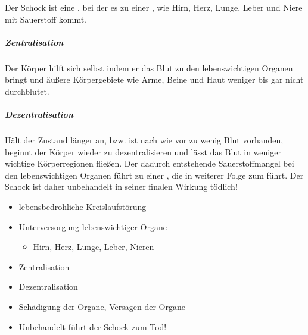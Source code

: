 {
Der Schock ist eine , bei der es zu einer
, wie Hirn,
Herz, Lunge, Leber und Niere mit Sauerstoff kommt. 

\subparagraph{Zentralisation} Der Körper hilft sich
selbst indem er das Blut zu den lebenswichtigen Organen bringt und äußere Körpergebiete wie Arme,
Beine und Haut weniger bis gar nicht durchblutet. 

\subparagraph{Dezentralisation} Hält
der Zustand länger an, bzw. ist nach wie vor zu wenig Blut vorhanden, beginnt
der Körper wieder zu dezentralisieren und lässt das Blut in weniger
wichtige Körperregionen fließen. Der dadurch entstehende Sauerstoffmangel
bei den lebenswichtigen Organen führt zu einer , die
in weiterer Folge zum  führt. Der Schock
ist daher unbehandelt in seiner finalen Wirkung tödlich!
}{
\begin{itemize}
    \item lebensbedrohliche Kreislaufstörung
    \item Unterversorgung lebenswichtiger Organe
    \begin{itemize}
        \item Hirn, Herz, Lunge, Leber, Nieren
    \end{itemize}
    \item Zentralisation
    \item Dezentralisation
    \item Schädigung der Organe, Versagen der Organe
    \item Unbehandelt führt der Schock zum Tod!
\end{itemize}
}{}{}{}




